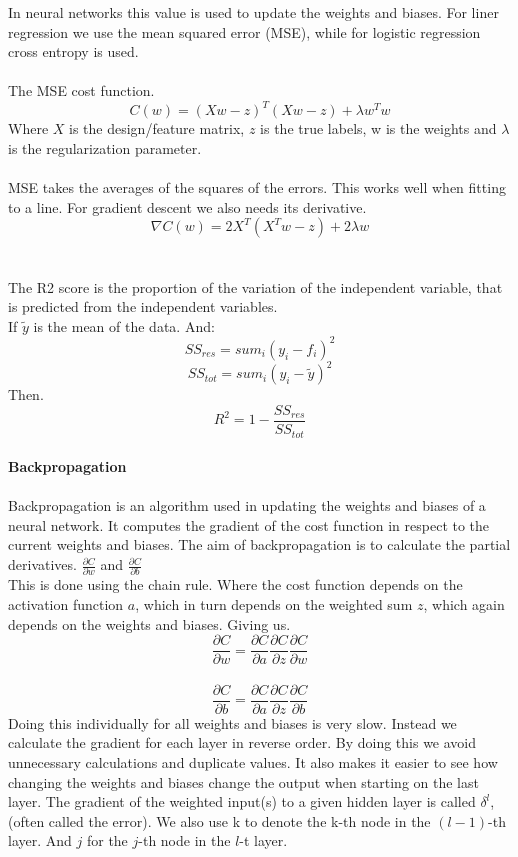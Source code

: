 \documentclass[12pt, letterpaper, twoside]{article}
\begin{document}
In neural networks this value is used to update the weights and biases. For liner regression we use the mean squared error (MSE), while for logistic regression cross entropy is used.\\
\ \\
The MSE cost function.
$$
C(w) = (Xw - z)^T(Xw - z) + \lambda w^T w
$$
Where $X$ is the design/feature matrix, $z$ is the true labels, w is the weights and $\lambda$ is the regularization parameter.\\
\ \\
MSE takes the averages of the squares of the errors. This works well when fitting to a line. For gradient descent we also needs its derivative.
$$
\nabla C(w) = 2 X^T (X^T w - z) + 2 \lambda w
$$
\ \\
\ \\
The R2 score is the proportion of the variation of the independent variable, that is predicted from the independent variables.\\
If $\tilde{y}$ is the mean of the data. And:
$$
SS_{res} = sum_i (y_i - f_i)^2 
$$
$$
SS_{tot} = sum_i (y_i - \tilde{y})^2
$$
Then.
$$
R^2 = 1 - \frac{SS_{res}}{SS_{tot}}
$$
\ \\
\textbf{Backpropagation}\\
\ \\
Backpropagation is an algorithm used in updating the weights and biases of a neural network. It computes the gradient of the cost function in respect to the current weights and biases. The aim of backpropagation is to calculate the partial derivatives.
$\frac{\partial C}{\partial w}$ and $\frac{\partial C}{\partial b}$\\
This is done using the chain rule. Where the cost function depends on the activation function $a$, which in turn depends on the weighted sum $z$, which again depends on the weights and biases. Giving us.\\
$$
\frac{\partial C}{\partial w} = \frac{\partial C}{\partial a}\frac{\partial C}{\partial z}\frac{\partial C}{\partial w}
$$
\ \\
$$
\frac{\partial C}{\partial b} = \frac{\partial C}{\partial a}\frac{\partial C}{\partial z}\frac{\partial C}{\partial b}
$$
Doing this individually for all weights and biases is very slow. Instead we calculate the gradient for each layer in reverse order. By doing this we avoid unnecessary calculations and duplicate values. It also makes it easier to see how changing the weights and biases change the output when starting on the last layer. The gradient of the weighted input(s) to a given hidden layer is called $\delta^l$, (often called the error). We also use k to denote the k-th node in the $(l-1)$-th layer. And $j$ for the $j$-th node in the $l$-t layer.\\
\end{document}
